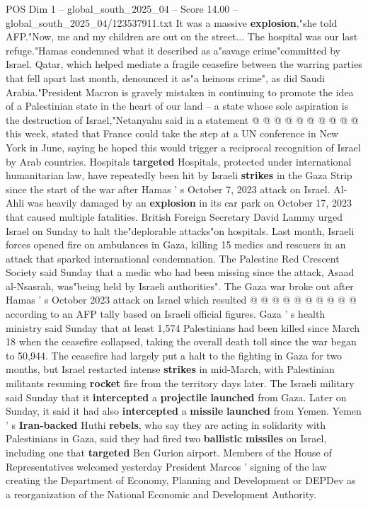 \begin{textsample}{POS Dim 1 – global\_south\_2025\_04 – Score 14.00 – global\_south\_2025\_04/123537911.txt}
It was a massive \textbf{explosion},"she told AFP."Now, me and my children are out on the street...
The hospital was our last refuge."Hamas condemned what it described as a"savage crime"committed by Israel.
Qatar, which helped mediate a fragile ceasefire between the warring parties that fell apart last month, denounced it as"a heinous crime", as did Saudi Arabia."President Macron is gravely mistaken in continuing to promote the idea of a Palestinian state in the heart of our land -- a state whose sole aspiration is the destruction of Israel,"Netanyahu said in a statement @ @ @ @ @ @ @ @ @ @ this week, stated that France could take the step at a UN conference in New York in June, saying he hoped this would trigger a reciprocal recognition of Israel by Arab countries.
Hospitals \textbf{targeted} Hospitals, protected under international humanitarian law, have repeatedly been hit by Israeli \textbf{strikes} in the Gaza Strip since the start of the war after Hamas ' s October 7, 2023 attack on Israel.
Al-Ahli was heavily damaged by an \textbf{explosion} in its car park on October 17, 2023 that caused multiple fatalities.
British Foreign Secretary David Lammy urged Israel on Sunday to halt the"deplorable attacks"on hospitals.
Last month, Israeli forces opened fire on ambulances in Gaza, killing 15 medics and rescuers in an attack that sparked international condemnation.
The Palestine Red Crescent Society said Sunday that a medic who had been missing since the attack, Asaad al-Nsasrah, was"being held by Israeli authorities".
The Gaza war broke out after Hamas ' s October 2023 attack on Israel which resulted @ @ @ @ @ @ @ @ @ @ according to an AFP tally based on Israeli official figures.
Gaza ' s health ministry said Sunday that at least 1,574 Palestinians had been killed since March 18 when the ceasefire collapsed, taking the overall death toll since the war began to 50,944.
The ceasefire had largely put a halt to the fighting in Gaza for two months, but Israel restarted intense \textbf{strikes} in mid-March, with Palestinian militants resuming \textbf{rocket} fire from the territory days later.
The Israeli military said Sunday that it \textbf{intercepted} a \textbf{projectile} \textbf{launched} from Gaza.
Later on Sunday, it said it had also \textbf{intercepted} a \textbf{missile} \textbf{launched} from Yemen.
Yemen ' s \textbf{Iran-backed} Huthi \textbf{rebels}, who say they are acting in solidarity with Palestinians in Gaza, said they had fired two \textbf{ballistic} \textbf{missiles} on Israel, including one that \textbf{targeted} Ben Gurion airport.
Members of the House of Representatives welcomed yesterday President Marcos ' signing of the law creating the Department of Economy, Planning and Development or DEPDev as a reorganization of the National Economic and Development Authority.

\end{textsample}
